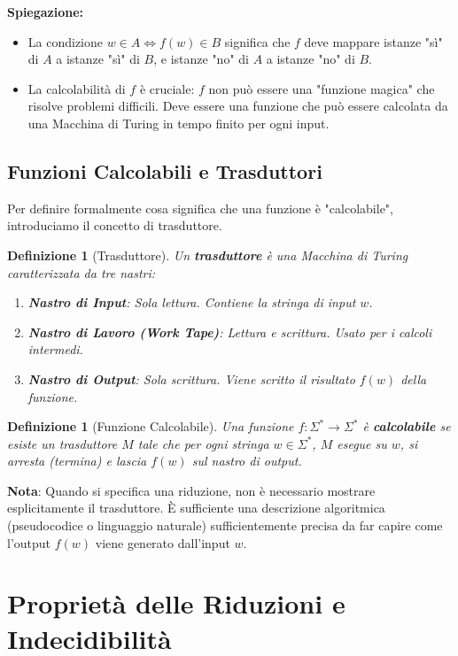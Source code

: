\documentclass[a4paper]{article}
\newtheorem{definition}[theorem]{Definizione}
\begin{document}
\textbf{Spiegazione:}
\begin{itemize}
    \item La condizione $w \in A \iff f(w) \in B$ significa che $f$ deve mappare istanze "sì" di $A$ a istanze "sì" di $B$, e istanze "no" di $A$ a istanze "no" di $B$.
    \item La calcolabilità di $f$ è cruciale: $f$ non può essere una "funzione magica" che risolve problemi difficili. Deve essere una funzione che può essere calcolata da una Macchina di Turing in tempo finito per ogni input.
\end{itemize}

\subsection{Funzioni Calcolabili e Trasduttori}

Per definire formalmente cosa significa che una funzione è "calcolabile", introduciamo il concetto di trasduttore.

\begin{definition}[Trasduttore]
Un \textbf{trasduttore} è una Macchina di Turing caratterizzata da tre nastri:
\begin{enumerate}
    \item \textbf{Nastro di Input}: Sola lettura. Contiene la stringa di input $w$.
    \item \textbf{Nastro di Lavoro (Work Tape)}: Lettura e scrittura. Usato per i calcoli intermedi.
    \item \textbf{Nastro di Output}: Sola scrittura. Viene scritto il risultato $f(w)$ della funzione.
\end{enumerate}
\end{definition}

\begin{definition}[Funzione Calcolabile]
Una funzione $f: \Sigma^* \to \Sigma^*$ è \textbf{calcolabile} se esiste un trasduttore $M$ tale che per ogni stringa $w \in \Sigma^*$, $M$ esegue su $w$, si arresta (termina) e lascia $f(w)$ sul nastro di output.
\end{definition}
\textbf{Nota}: Quando si specifica una riduzione, non è necessario mostrare esplicitamente il trasduttore. È sufficiente una descrizione algoritmica (pseudocodice o linguaggio naturale) sufficientemente precisa da far capire come l'output $f(w)$ viene generato dall'input $w$.

\section{Proprietà delle Riduzioni e Indecidibilità}
\end{document}
